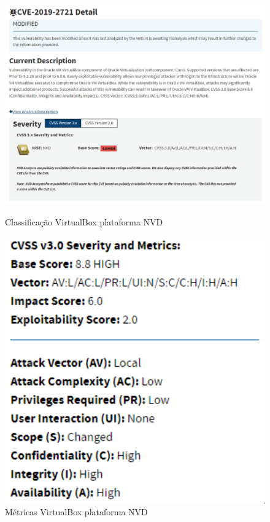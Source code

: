 \documentclass[11t]{article}
\begin{document}
\begin{figure}[H]
    \centering
    \begin{minipage}{0.62\textwidth}
        \centering
        \includegraphics[width=1\textwidth]{images/classificacaoVirtualBox.png}
        \caption{Classificação VirtualBox plataforma NVD}
    \end{minipage}
    \hfill
    \begin{minipage}{0.36\textwidth}
        \centering
        \includegraphics[width=1\textwidth]{images/metricasVirtualBox.png}
        \caption{Métricas VirtualBox plataforma NVD}
    \end{minipage}
\end{figure}
\end{document}
